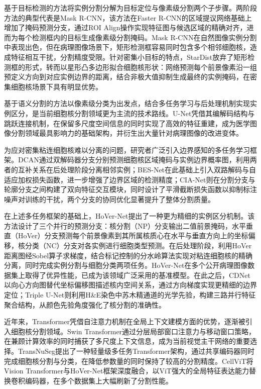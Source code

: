 \documentclass{sufethesismas}
\begin{document}
基于目标检测的方法将实例分割分解为目标定位与像素级分割两个子步骤。两阶段方法的典型代表是Mask R-CNN\cite{He2017mask}，该方法在Faster R-CNN的区域提议网络基础上增加了掩码预测分支，通过ROI Align操作实现特征图与候选区域的精确对齐，进而为每个检测框内的目标生成像素级分割掩码。Mask R-CNN在自然图像实例分割中表现出色，但在病理图像场景下，矩形检测框容易同时包含多个相邻细胞核，造成特征相互干扰，分割精度受限。针对密集小目标的特点，StarDist\cite{Schmidt2018}放弃了矩形检测框的形式，转而以星形凸多边形拟合细胞核形状：网络预测每个前景像素沿一组预定义方向到对应实例边界的距离，结合非极大值抑制生成最终的实例掩码，在密集细胞核场景下具有明显优势。

基于语义分割的方法以像素级分类为出发点，结合多任务学习与后处理机制实现实例区分，是当前细胞核分割领域更为主流的技术路线。U-Net\cite{Ronneberger2015}凭借其编解码结构与跳跃连接机制，在保留多尺度空间信息的同时实现了高效的特征重建，成为医学图像分割领域最具影响力的基础架构，并衍生出大量针对病理图像的改进变体。

为应对密集粘连细胞核难以分离的问题，研究者广泛引入边界感知的多任务学习框架。DCAN\cite{Chen2016dcan}通过双解码器分支分别预测细胞核区域掩码与实例边界概率图，利用两者的互补关系在后处理阶段分离相邻实例；BES-Net\cite{Oda2018}在此基础上引入双路解码与自适应加权损失函数，进一步增强了边界区域的检测精度；CIA-Net\cite{ZhouY2019}则在分割分支与轮廓分支之间构建了双向特征交互模块，同时设计了平滑截断损失函数以抑制标注噪声对训练的干扰，两个分支的协同优化显著提升了整体分割质量。

在上述多任务框架的基础上，HoVer-Net\cite{Graham2019}提出了一种更为精细的实例区分机制。该方法设计了三个并行的预测分支：核分割（NP）分支输出二值前景掩码，水平垂直（HoVer）分支预测每个前景像素到其所属核质心在水平与垂直方向上的坐标偏移，核分类（NC）分支对各实例进行细胞类型预测。在后处理阶段，利用HoVer距离图经Sobel算子求梯度，结合标记控制的分水岭算法实现对粘连细胞核的精确分离，同时完成实例分割与细胞分类两项任务。HoVer-Net在多个公开病理图像数据集上取得了优异性能，已成为该领域广泛采用的基准模型。在此之后，CDNet\cite{He2021cdn}以向心方向图替代坐标偏移图描述核内空间关系，通过方向梯度实现更精细的边界定位；Triple U-Net\cite{Zhao2020}则利用H\&E染色中苏木精通道的光学先验，构建三路并行特征聚合结构，从颜色先验角度强化了核分割的准确性。

近年来，Transformer凭借自注意力机制在全局上下文建模方面的优势，逐渐被引入细胞核分割领域。Swin Transformer\cite{Liu2021swin}通过分层局部窗口注意力与移动窗口策略，在兼顾计算效率的同时捕获了多尺度上下文信息，成为当前视觉主干网络的重要选择。TransNuSeg\cite{He2023transnu}提出了一种轻量级多任务Transformer架构，通过共享编码器同时完成细胞核分割与分类，在降低参数量的同时保持了较高的分割精度。CellViT\cite{Horst2024}将Vision Transformer与HoVer-Net框架深度融合，以ViT强大的全局特征表达能力替换卷积编码器，在多个数据集上大幅刷新了分割性能。
\end{document}
